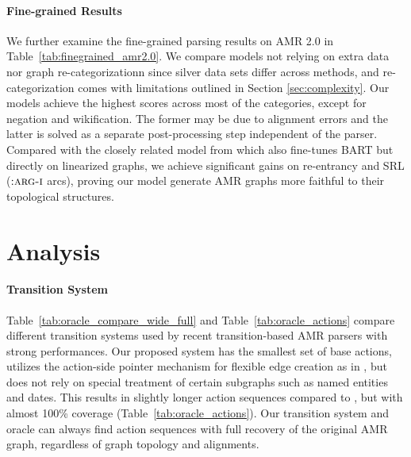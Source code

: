 \paragraph{Fine-grained Results}

We further examine the fine-grained parsing results on AMR 2.0 in Table~\ref{tab:finegrained_amr2.0}. We compare models not relying on extra data nor graph re-categorizationn since silver data sets differ across methods, and re-categorization comes with limitations outlined in Section \ref{sec:complexity}. Our models achieve the highest scores across most of the categories, except for negation and wikification. The former may be due to alignment errors and the latter is solved as a separate post-processing step independent of the parser. Compared with the closely related model from \citet{bevilacqua2021one} which also fine-tunes BART but directly on linearized graphs, we achieve significant gains on re-entrancy and SRL ($\textsc{:arg-i}$ arcs), proving our
model generate AMR graphs more faithful to their topological structures.

\section{Analysis}
\label{sec:analysis}



\paragraph{Transition System}

Table~\ref{tab:oracle_compare_wide_full} and Table~\ref{tab:oracle_actions} compare different transition systems used by recent transition-based AMR parsers with strong performances. Our proposed system has the smallest set of base actions, utilizes the action-side pointer mechanism for flexible edge creation as in \citet{zhou2021amr}, but does not rely on special treatment of certain subgraphs such as named entities and dates. This results in slightly longer action sequences compared to \citet{zhou2021amr}, but with almost 100\% coverage\footnotemark{} (Table~\ref{tab:oracle_actions}).
Our transition system and oracle can always find action sequences with full recovery of the original AMR graph, regardless of graph topology and alignments.

